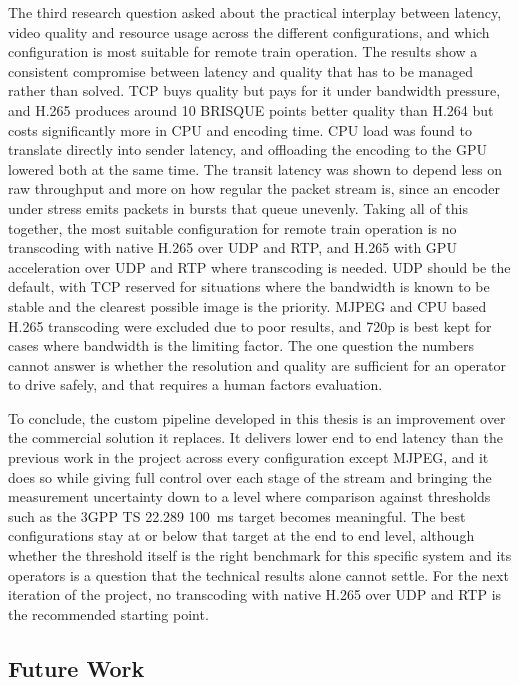The third research question asked about the practical interplay between latency, video quality and resource usage across the different configurations, and which configuration is most suitable for remote train operation. The results show a consistent compromise between latency and quality that has to be managed rather than solved. TCP buys quality but pays for it under bandwidth pressure, and H.265 produces around 10 BRISQUE points better quality than H.264 but costs significantly more in CPU and encoding time. CPU load was found to translate directly into sender latency, and offloading the encoding to the GPU lowered both at the same time. The transit latency was shown to depend less on raw throughput and more on how regular the packet stream is, since an encoder under stress emits packets in bursts that queue unevenly. Taking all of this together, the most suitable configuration for remote train operation is no transcoding with native H.265 over UDP and RTP, and H.265 with GPU acceleration over UDP and RTP where transcoding is needed. UDP should be the default, with TCP reserved for situations where the bandwidth is known to be stable and the clearest possible image is the priority. MJPEG and CPU based H.265 transcoding were excluded due to poor results, and 720p is best kept for cases where bandwidth is the limiting factor. The one question the numbers cannot answer is whether the resolution and quality are sufficient for an operator to drive safely, and that requires a human factors evaluation.

To conclude, the custom pipeline developed in this thesis is an improvement over the commercial solution it replaces. It delivers lower end to end latency than the previous work in the project across every configuration except MJPEG, and it does so while giving full control over each stage of the stream and bringing the measurement uncertainty down to a level where comparison against thresholds such as the 3GPP TS 22.289 100~ms target becomes meaningful. The best configurations stay at or below that target at the end to end level, although whether the threshold itself is the right benchmark for this specific system and its operators is a question that the technical results alone cannot settle. For the next iteration of the project, no transcoding with native H.265 over UDP and RTP is the recommended starting point.

\subsection{Future Work}

